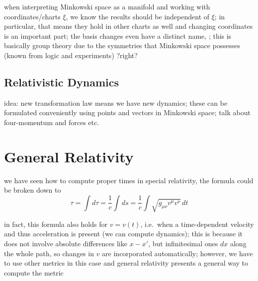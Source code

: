 when interpreting Minkowski space as a manifold and working with coordinates/charts $\xi$, we know the results should be independent of $\xi$; in particular, that means they hold in other charts as well and changing coordinates is an important part; the basis changes even have a distinct name, ; this is basically group theory due to the symmetries that Minkowski space possesses (known from logic and experiments) ?right?



		\subsection{Relativistic Dynamics}
idea: new transformation law means we have new dynamics; these can be formulated conveniently using points and vectors in Minkowski space; talk about four-momentum and forces etc.


\newpage


	\section{General Relativity}
we have seen how to compute proper times in special relativity, the formula could be broken down to 
\begin{equation}
\tau = \int d\tau = \frac{1}{c} \int ds = \frac{1}{c} \int \sqrt{g_{\mu \nu} v^\mu v^\nu} \, dt
\end{equation}

in fact, this formula also holds for $v = v(t)$, i.e.~when a time-dependent velocity and thus acceleration is present (we can compute dynamics); this is because it does not involve absolute differences like $x - x'$, but infinitesimal ones $dx$ along the whole path, so changes in $v$ are incorporated automatically; however, we have to use other metrics in this case and general relativity presents a general way to compute the metric




